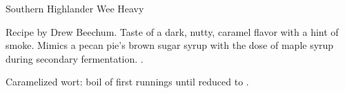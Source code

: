 \begin{recipe}{Southern Highlander Wee Heavy}

\begin{aboutblock}
Recipe by Drew Beechum. Taste of a dark, nutty, caramel flavor with a hint of smoke.
Mimics a pecan pie's brown sugar syrup with the dose of maple syrup during secondary
fermentation. .
\end{aboutblock}


\begin{methodandtiming}

\begin{mashsteps}
\end{mashsteps}

\begin{directions}
Caramelized wort: boil  of first runnings until reduced to .
\end{directions}

\end{methodandtiming}

\recipebreak

\begin{ingredientsblock}

\begin{malts}
\end{malts}

\begin{hops}
\end{hops}


\begin{twists}
\end{twists}

\end{ingredientsblock}

\end{recipe}

